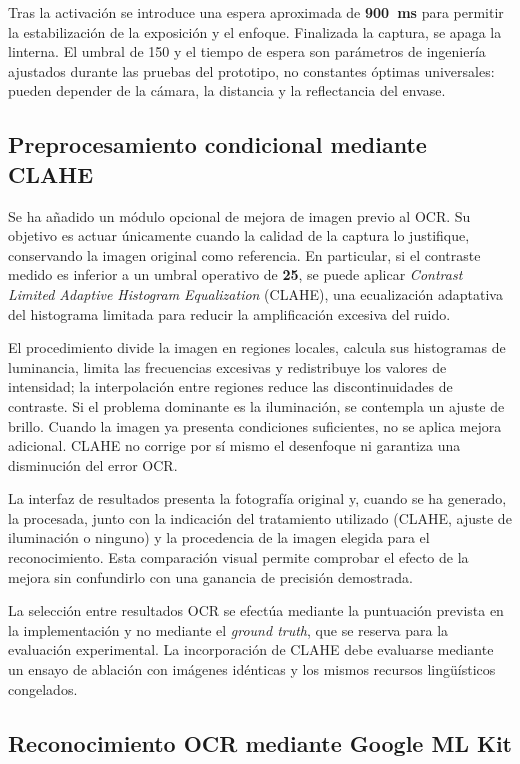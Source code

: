 Tras la activación se introduce una espera aproximada de \textbf{900~ms} para permitir la estabilización de la exposición y el enfoque. Finalizada la captura, se apaga la linterna. El umbral de 150 y el tiempo de espera son parámetros de ingeniería ajustados durante las pruebas del prototipo, no constantes óptimas universales: pueden depender de la cámara, la distancia y la reflectancia del envase.

\subsection{Preprocesamiento condicional mediante CLAHE}

Se ha añadido un módulo opcional de mejora de imagen previo al OCR. Su objetivo es actuar únicamente cuando la calidad de la captura lo justifique, conservando la imagen original como referencia. En particular, si el contraste medido es inferior a un umbral operativo de \textbf{25}, se puede aplicar \textit{Contrast Limited Adaptive Histogram Equalization} (CLAHE), una ecualización adaptativa del histograma limitada para reducir la amplificación excesiva del ruido.

El procedimiento divide la imagen en regiones locales, calcula sus histogramas de luminancia, limita las frecuencias excesivas y redistribuye los valores de intensidad; la interpolación entre regiones reduce las discontinuidades de contraste. Si el problema dominante es la iluminación, se contempla un ajuste de brillo. Cuando la imagen ya presenta condiciones suficientes, no se aplica mejora adicional. CLAHE no corrige por sí mismo el desenfoque ni garantiza una disminución del error OCR.

La interfaz de resultados presenta la fotografía original y, cuando se ha generado, la procesada, junto con la indicación del tratamiento utilizado (CLAHE, ajuste de iluminación o ninguno) y la procedencia de la imagen elegida para el reconocimiento. Esta comparación visual permite comprobar el efecto de la mejora sin confundirlo con una ganancia de precisión demostrada.

La selección entre resultados OCR se efectúa mediante la puntuación prevista en la implementación y no mediante el \textit{ground truth}, que se reserva para la evaluación experimental. La incorporación de CLAHE debe evaluarse mediante un ensayo de ablación con imágenes idénticas y los mismos recursos lingüísticos congelados.

\subsection{Reconocimiento OCR mediante Google ML Kit}

